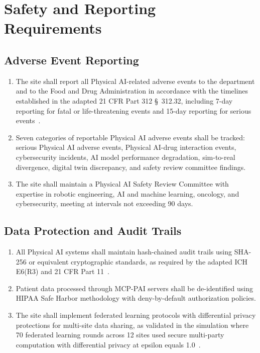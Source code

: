 \documentclass[11pt,letterpaper]{article}
\begin{document}
\section{Safety and Reporting Requirements}

\subsection{Adverse Event Reporting}

\begin{enumerate}[label=(\alph*)]
\item The site shall report all Physical AI-related adverse events to the
  department and to the Food and Drug Administration in accordance with the
  timelines established in the adapted 21 CFR Part 312 \S~312.32, including
  7-day reporting for fatal or life-threatening events and 15-day reporting for
  serious events~\cite{cfr312adapt}.

\item Seven categories of reportable Physical AI adverse events shall be
  tracked: serious Physical AI adverse events, Physical AI-drug interaction
  events, cybersecurity incidents, AI model performance degradation,
  sim-to-real divergence, digital twin discrepancy, and safety review committee
  findings.

\item The site shall maintain a Physical AI Safety Review Committee with
  expertise in robotic engineering, AI and machine learning, oncology, and
  cybersecurity, meeting at intervals not exceeding 90 days.
\end{enumerate}

\subsection{Data Protection and Audit Trails}

\begin{enumerate}[label=(\alph*)]
\item All Physical AI systems shall maintain hash-chained audit trails using
  SHA-256 or equivalent cryptographic standards, as required by the adapted
  ICH E6(R3) and 21 CFR Part 11~\cite{iche6r3adapt}.

\item Patient data processed through MCP-PAI servers shall be de-identified
  using HIPAA Safe Harbor methodology with deny-by-default authorization
  policies.

\item The site shall implement federated learning protocols with differential
  privacy protections for multi-site data sharing, as validated in the
  simulation where 70 federated learning rounds across 12 sites used secure
  multi-party computation with differential privacy at epsilon equals
  1.0~\cite{patientjourney2026}.
\end{enumerate}
\end{document}
